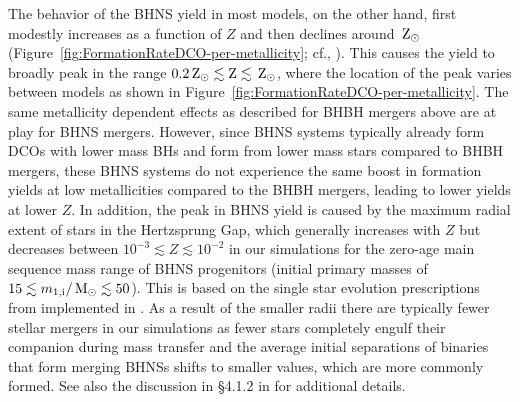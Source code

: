 \documentclass[fleqn,usenatbib]{mnras}
\newcommand{\monei}{\ensuremath{m_{1,\rm{i}}}\xspace}
\newcommand{\Zi}{\ensuremath{Z}\xspace}
\newcommand{\Msun}{\ensuremath{\,\rm{M}_{\odot}}\xspace}
\newcommand{\Zsun}{\ensuremath{\,\rm{Z}_{\odot}}\xspace}
\begin{document}
The behavior of the \ac{BHNS} yield in most models, on the other hand, first modestly increases as a function of \Zi and then declines around $\Zsun$ (Figure~\ref{fig:FormationRateDCO-per-metallicity}; cf., \citealt[][]{2018A&A...619A..77K,Chruslinska:2019obsSFRD,RomanGarza:2020}). This causes the yield to broadly peak in the range $0.2\Zsun\lesssim \Zi \lesssim \Zsun$, where the location of the peak varies between models as shown in Figure~\ref{fig:FormationRateDCO-per-metallicity}. The same metallicity dependent effects as described for \ac{BHBH} mergers above are at play for \ac{BHNS} mergers. However, since \ac{BHNS} systems typically already form \acp{DCO} with lower mass \acp{BH} and form from lower mass stars compared to \ac{BHBH} mergers, these \ac{BHNS} systems do not experience the same boost in formation yields at low metallicities compared to the \ac{BHBH} mergers, leading to lower yields at lower \Zi. 
In addition, the peak in \ac{BHNS} yield is caused by the maximum radial extent of stars in the Hertzsprung Gap, which generally increases  with \Zi but decreases  between $ 10^{-3} \lesssim \Zi \lesssim 10^{-2}$ in our simulations for the zero-age main sequence mass range of \ac{BHNS} progenitors (initial primary masses of $15 \lesssim \monei / \Msun \lesssim 50 $). This is based on the single star evolution prescriptions from \citet{2000MNRAS.315..543H} implemented in {}. As a result of the smaller radii there are typically fewer stellar mergers in our simulations as fewer stars completely engulf their companion during mass transfer \citep[as discussed  by][]{GiacobboMapelli:2018} and the average initial separations of binaries that form merging \acp{BHNS} shifts to smaller values, which are more commonly formed. See also the discussion in \S4.1.2 in \citet{2018A&A...619A..77K} for additional details.
\end{document}

